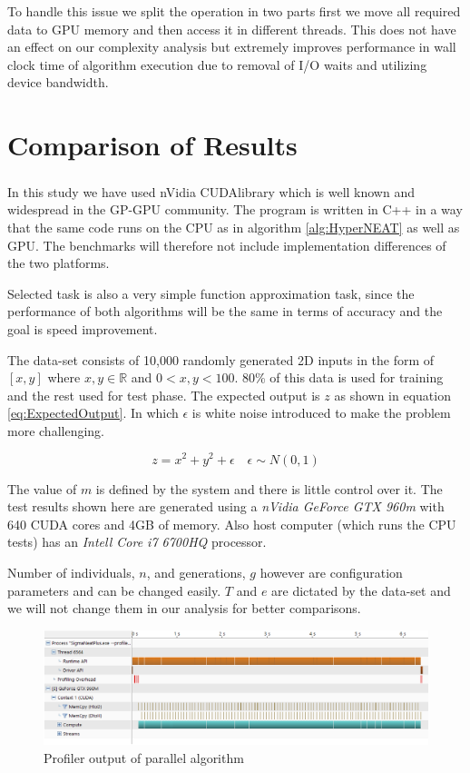 \documentclass[twocolumn]{article}
\begin{document}
To handle this issue we split the operation in two parts first we move all required data to GPU memory and then access it in different threads. This does not have an effect on our complexity analysis but extremely improves performance in wall clock time of algorithm execution due to removal of I/O waits and utilizing device bandwidth.



\section{Comparison of Results}
In this study we have used nVidia CUDA\textsuperscript \textregistered library which is well known and widespread in the GP-GPU community. The program is written in C++ in a way that the same code runs on the CPU as in algorithm \ref{alg:HyperNEAT} as well as GPU. The benchmarks will therefore not include implementation differences of the two platforms.

Selected task is also a very simple function approximation task, since the performance of both algorithms will be the same in terms of accuracy and the goal is speed improvement.

The data-set consists of 10,000 randomly generated 2D inputs in the form of $[x,y]$ where $x,y \in \mathbb{R}$ and $0<x,y<100$. 80\% of this data is used for training and the rest used for test phase. The expected output is $z$ as shown in equation \ref{eq:ExpectedOutput}. In which $\epsilon$ is white noise introduced to make the problem more challenging.

\begin{equation}
    \label{eq:ExpectedOutput}
    z=x^2+y^2+\epsilon \quad \epsilon \sim N(0,1)
\end{equation}

The value of $m$ is defined by the system and there is little control over it. The test results shown here are generated using a \textit{nVidia GeForce GTX 960m} with 640 CUDA cores and 4GB of memory. Also host computer (which runs the CPU tests) has an \textit{Intell Core i7 6700HQ} processor.

Number of individuals, $n$, and generations, $g$ however are configuration parameters and can be changed easily. $T$ and $e$ are dictated by the data-set and we will not change them in our analysis for better comparisons.

\begin{figure}
    \centering \includegraphics[width=\textwidth]{ProfiledSingleGenerationOf100}
    \caption{Profiler output of parallel algorithm}
    \label{img:profiler}
\end{figure}
\end{document}
